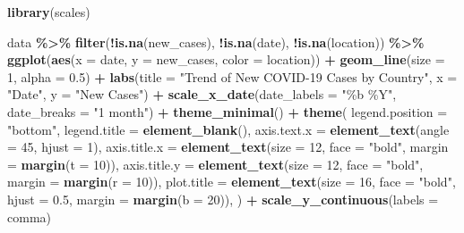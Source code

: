 \documentclass[
]{article}
\newenvironment{Shaded}{\begin{snugshade}}{\end{snugshade}}
\newcommand{\AttributeTok}[1]{\textcolor[rgb]{0.13,0.29,0.53}{#1}}
\newcommand{\DecValTok}[1]{\textcolor[rgb]{0.00,0.00,0.81}{#1}}
\newcommand{\FloatTok}[1]{\textcolor[rgb]{0.00,0.00,0.81}{#1}}
\newcommand{\FunctionTok}[1]{\textcolor[rgb]{0.13,0.29,0.53}{\textbf{#1}}}
\newcommand{\NormalTok}[1]{#1}
\newcommand{\SpecialCharTok}[1]{\textcolor[rgb]{0.81,0.36,0.00}{\textbf{#1}}}
\newcommand{\StringTok}[1]{\textcolor[rgb]{0.31,0.60,0.02}{#1}}
\begin{document}
\begin{Shaded}
\begin{Highlighting}[]
\FunctionTok{library}\NormalTok{(scales)}

\NormalTok{data }\SpecialCharTok{\%\textgreater{}\%}
  \FunctionTok{filter}\NormalTok{(}\SpecialCharTok{!}\FunctionTok{is.na}\NormalTok{(new\_cases), }\SpecialCharTok{!}\FunctionTok{is.na}\NormalTok{(date), }\SpecialCharTok{!}\FunctionTok{is.na}\NormalTok{(location)) }\SpecialCharTok{\%\textgreater{}\%}
  \FunctionTok{ggplot}\NormalTok{(}\FunctionTok{aes}\NormalTok{(}\AttributeTok{x =}\NormalTok{ date, }\AttributeTok{y =}\NormalTok{ new\_cases, }\AttributeTok{color =}\NormalTok{ location)) }\SpecialCharTok{+}
  \FunctionTok{geom\_line}\NormalTok{(}\AttributeTok{size =} \DecValTok{1}\NormalTok{, }\AttributeTok{alpha =} \FloatTok{0.5}\NormalTok{) }\SpecialCharTok{+}
  \FunctionTok{labs}\NormalTok{(}\AttributeTok{title =} \StringTok{"Trend of New COVID{-}19 Cases by Country"}\NormalTok{, }\AttributeTok{x =} \StringTok{"Date"}\NormalTok{, }\AttributeTok{y =} \StringTok{"New Cases"}\NormalTok{) }\SpecialCharTok{+}
  \FunctionTok{scale\_x\_date}\NormalTok{(}\AttributeTok{date\_labels =} \StringTok{"\%b \%Y"}\NormalTok{, }\AttributeTok{date\_breaks =} \StringTok{"1 month"}\NormalTok{) }\SpecialCharTok{+}
  \FunctionTok{theme\_minimal}\NormalTok{() }\SpecialCharTok{+}
  \FunctionTok{theme}\NormalTok{(}
    \AttributeTok{legend.position =} \StringTok{"bottom"}\NormalTok{, }\AttributeTok{legend.title =} \FunctionTok{element\_blank}\NormalTok{(),}
    \AttributeTok{axis.text.x =} \FunctionTok{element\_text}\NormalTok{(}\AttributeTok{angle =} \DecValTok{45}\NormalTok{, }\AttributeTok{hjust =} \DecValTok{1}\NormalTok{),}
    \AttributeTok{axis.title.x =} \FunctionTok{element\_text}\NormalTok{(}\AttributeTok{size =} \DecValTok{12}\NormalTok{, }\AttributeTok{face =} \StringTok{"bold"}\NormalTok{, }\AttributeTok{margin =} \FunctionTok{margin}\NormalTok{(}\AttributeTok{t =} \DecValTok{10}\NormalTok{)),}
    \AttributeTok{axis.title.y =} \FunctionTok{element\_text}\NormalTok{(}\AttributeTok{size =} \DecValTok{12}\NormalTok{, }\AttributeTok{face =} \StringTok{"bold"}\NormalTok{, }\AttributeTok{margin =} \FunctionTok{margin}\NormalTok{(}\AttributeTok{r =} \DecValTok{10}\NormalTok{)),}
    \AttributeTok{plot.title =} \FunctionTok{element\_text}\NormalTok{(}\AttributeTok{size =} \DecValTok{16}\NormalTok{, }\AttributeTok{face =} \StringTok{"bold"}\NormalTok{, }\AttributeTok{hjust =} \FloatTok{0.5}\NormalTok{, }\AttributeTok{margin =} \FunctionTok{margin}\NormalTok{(}\AttributeTok{b =} \DecValTok{20}\NormalTok{)),}
\NormalTok{  ) }\SpecialCharTok{+}
  \FunctionTok{scale\_y\_continuous}\NormalTok{(}\AttributeTok{labels =}\NormalTok{ comma)}
\end{Highlighting}
\end{Shaded}
\end{document}

